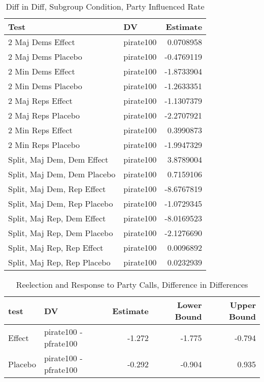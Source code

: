 \documentclass[12pt]{article}
\begin{document}
\begin{table}[H]
	\centering
	\singlespacing
	\caption{Diff in Diff, Subgroup Condition, Party Influenced Rate} 
	\begin{tabular}{llr}
		\hline
		Test & DV & Estimate \\ 
		\hline
		2 Maj Dems Effect & pirate100 & 0.0708958 \\ 
		2 Maj Dems Placebo & pirate100 & -0.4769119 \\ 
		2 Min Dems Effect & pirate100 & -1.8733904 \\ 
		2 Min Dems Placebo & pirate100 & -1.2633351 \\ 
		2 Maj Reps Effect & pirate100 & -1.1307379 \\ 
		2 Maj Reps Placebo & pirate100 & -2.2707921 \\ 
		2 Min Reps Effect & pirate100 & 0.3990873 \\ 
		2 Min Reps Placebo & pirate100 & -1.9947329 \\ 
		Split, Maj Dem, Dem Effect & pirate100 & 3.8789004 \\ 
		Split, Maj Dem, Dem Placebo & pirate100 & 0.7159106 \\ 
		Split, Maj Dem, Rep Effect & pirate100 & -8.6767819 \\ 
		Split, Maj Dem, Rep Placebo & pirate100 & -1.0729345 \\ 
		Split, Maj Rep, Dem Effect & pirate100 & -8.0169523 \\ 
		Split, Maj Rep, Dem Placebo & pirate100 & -2.1276690 \\ 
		Split, Maj Rep, Rep Effect & pirate100 & 0.0096892 \\ 
		Split, Maj Rep, Rep Placebo & pirate100 & 0.0232939 \\ 
		\hline
	\end{tabular}
\end{table}

\begin{table}[H]
	\centering
	\singlespacing
	\caption{Reelection and Response to Party Calls, Difference in Differences} 
	\begin{tabular}{llrrr}
		\hline
		test & DV & Estimate & Lower Bound & Upper Bound \\ 
		\hline
		Effect & pirate100 - pfrate100 & -1.272 & -1.775 & -0.794 \\ 
		Placebo & pirate100 - pfrate100 & -0.292 & -0.904 & 0.935 \\ 
		\hline
	\end{tabular}
\end{table}
\end{document}
